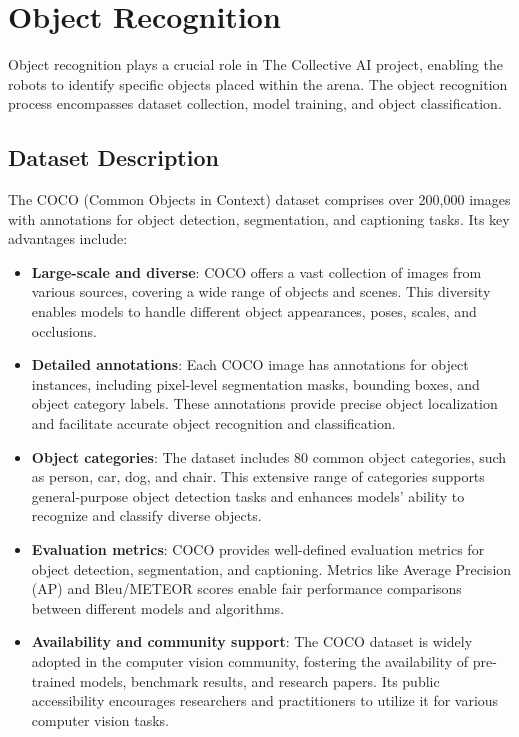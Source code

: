 \documentclass[a4paper,12pt,oneside]{book}
\begin{document}
\section{Object Recognition}
Object recognition plays a crucial role in The Collective AI project, enabling the robots to identify specific objects placed within the arena. The object recognition process encompasses dataset collection, model training, and object classification.

\subsection{Dataset Description}

The COCO (Common Objects in Context) dataset comprises over 200,000 images with annotations for object detection, segmentation, and captioning tasks. Its key advantages include:

\begin{itemize}
  \item \textbf{Large-scale and diverse}: COCO offers a vast collection of images from various sources, covering a wide range of objects and scenes. This diversity enables models to handle different object appearances, poses, scales, and occlusions.
  
  \item \textbf{Detailed annotations}: Each COCO image has annotations for object instances, including pixel-level segmentation masks, bounding boxes, and object category labels. These annotations provide precise object localization and facilitate accurate object recognition and classification.
  
  \item \textbf{Object categories}: The dataset includes 80 common object categories, such as person, car, dog, and chair. This extensive range of categories supports general-purpose object detection tasks and enhances models' ability to recognize and classify diverse objects.
  
  \item \textbf{Evaluation metrics}: COCO provides well-defined evaluation metrics for object detection, segmentation, and captioning. Metrics like Average Precision (AP) and Bleu/METEOR scores enable fair performance comparisons between different models and algorithms.
  
  \item \textbf{Availability and community support}: The COCO dataset is widely adopted in the computer vision community, fostering the availability of pre-trained models, benchmark results, and research papers. Its public accessibility encourages researchers and practitioners to utilize it for various computer vision tasks.
\end{itemize}
\end{document}
